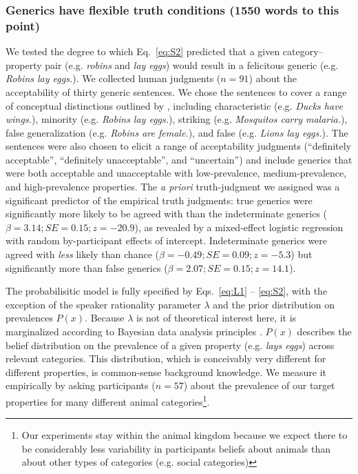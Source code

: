 \documentclass[10pt,letterpaper]{article}
\newcommand{\ndg}[1]{\textcolor{Green}{[ndg: #1]}}
\begin{document}
\subsubsection*{Generics have flexible truth conditions (1550 words to this point)} 

We tested the degree to which Eq.~\ref{eq:S2} predicted that a given category--property pair (e.g. \emph{robins} and \emph{lay eggs}) would result in a felicitous generic (e.g. \emph{Robins lay eggs.}). 
We collected human judgments ($n=91$) about the acceptability of thirty generic sentences. 
We chose the sentences to cover a range of conceptual distinctions outlined by , including characteristic (e.g. \emph{Ducks have wings.}), minority (e.g. \emph{Robins lay eggs.}), striking (e.g. \emph{Mosquitos carry malaria.}), false generalization (e.g. \emph{Robins are female.}), and false (e.g. \emph{Lions lay eggs.}).
The sentences were also chosen to elicit a range of acceptability judgments (``definitely acceptable'', ``definitely unacceptable'', and ``uncertain'') and include generics that were both acceptable and unacceptable with low-prevalence, medium-prevalence, and high-prevalence properties.
%
The \emph{a priori} truth-judgment we assigned was a significant predictor of the empirical truth judgments: true generics were significantly more likely to be agreed with than the indeterminate generics ($\beta = 3.14; SE = 0.15; z = -20.9$), as revealed by a mixed-effect logistic regression with random by-participant effects of intercept.
Indeterminate generics were agreed with \emph{less} likely than chance ($\beta = -0.49; SE = 0.09; z = -5.3$) but significantly more than false generics ($\beta = 2.07; SE = 0.15; z = 14.1$).


The probabilisitic model is fully specified by Eqs.~\ref{eq:L1} -- \ref{eq:S2}, with the exception of the speaker rationality parameter $\lambda$ and the prior distribution on prevalences $P(x)$. 
Because $\lambda$ is not of theoretical interest here, it is marginalized according to Bayesian data analysis principles \cite{LW2014}. 
 $P(x)$ describes the belief distribution on the prevalence of a given property (e.g. \emph{lays eggs}) across relevant categories. 
 This distribution, which is conceivably very different for different properties, is common-sense background knowledge. 
 We measure it empirically by asking participants ($n=57$) about the prevalence of our target properties for many different animal categories\footnote{Our experiments stay within the animal kingdom because we expect there to be considerably less variability in participants beliefs about animals than about other types of categories (e.g. social categories)}. 
 
\end{document}
